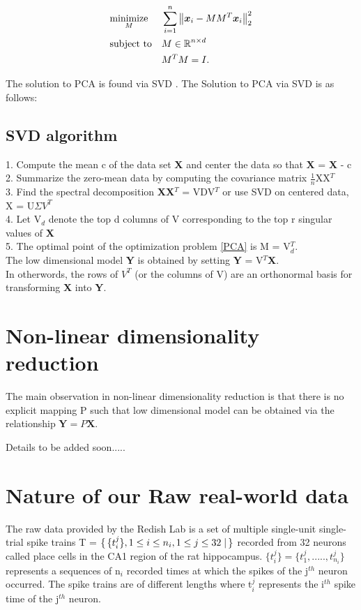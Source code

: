 \begin{equation}\label{PCA}
\begin{aligned}
& \underset{M}{\text{minimize}}
& & \sum_{i=1}^{n} \big \lVert \boldsymbol{x}_{i} - MM^{T}\boldsymbol{x}_{i} \big \rVert_{2}^{2} \\
& \text{subject to}
& & M \in \operatorname{\mathbb{R}}^{n \times d} \\
&&& M^{T}M = I.
\end{aligned}
\end{equation}

The solution  to PCA is found via SVD \cite{BishopChristopherM2006Pram, AmericanMathematicalSociety.1939Apat}. The Solution to PCA via SVD is as follows:

\subsection{SVD algorithm}
1. Compute the mean c of the data set \textbf{X} and center
the data so that \textbf{X} = \textbf{X} - c\\
2. Summarize the zero-mean data by computing the covariance matrix $\frac{1}{n}$XX$^{T}$\\
3. Find the spectral decomposition  \textbf{XX}$^{T}$ = VDV$^{T}$ or 
use SVD on centered data, X = U$\Sigma V^{T}$\\
4. Let V$_{d}$ denote the top d columns of V corresponding to the  top r singular values of \textbf{X}\\
5. The optimal point of the optimization problem \eqref{PCA} is M = V$_{d}^{T}$.\\
The low dimensional model \textbf{Y} is obtained by setting \textbf{Y} = V$^{T}$\textbf{X}.\\
In otherwords, the rows of $V^{T}$ (or the columns of V) are an orthonormal basis for transforming \textbf{X} into \textbf{Y}.




\section{Non-linear dimensionality reduction}
The main observation in non-linear dimensionality reduction is that there is no explicit mapping P such that low dimensional model can be obtained via the relationship 
$\textbf{Y} = P\textbf{X}$.

Details to be added soon.....



\section{Nature of our Raw real-world data}
The raw data provided by the Redish Lab is a set of multiple single-unit single-trial
spike trains 
T = $\displaystyle \Set{ \{ t_{i}^{j} \} , 1 \leq i \leq n_{i}, 1 \leq j \leq 32 } $ 
recorded from 32 neurons called  place cells  in the CA1 region of the rat hippocampus.
$\displaystyle  \{t_{i}^{j}\} =  \{t_{1}^{j}, ....., t_{n_{i}}^{j} \} $ represents 
a sequences of n$_{i}$ recorded times at which the spikes of the j$^{th}$ neuron occurred.
The spike trains are of different lengths where t$_{i}^{j}$ represents the i$^{th}$
spike time of the j$^{th}$ neuron.

